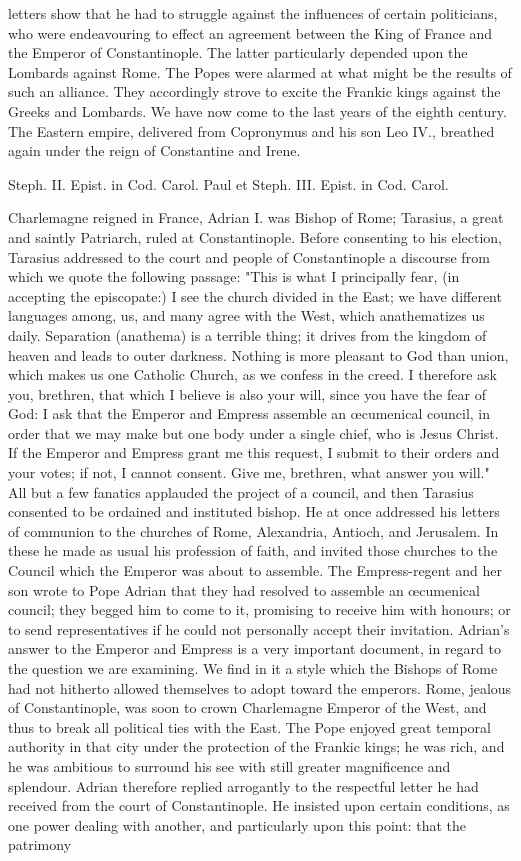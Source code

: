 letters show that he had to struggle against the influences of certain politicians, who were endeavouring to effect an agreement between the King of France and the Emperor of Constantinople. The latter particularly depended upon the Lombards against Rome. The Popes were alarmed at what might be the results of such an alliance. They accordingly strove to excite the Frankic kings against the Greeks and Lombards. We have now come to the last years of the eighth century. The Eastern empire, delivered from Copronymus and his son Leo IV., breathed again under the reign of Constantine and Irene.

Steph. II. Epist. in Cod. Carol. Paul et Steph. III. Epist. in Cod. Carol.

Charlemagne reigned in France, Adrian I. was Bishop of Rome; Tarasius, a great and saintly Patriarch, ruled at Constantinople. Before consenting to his election, Tarasius addressed to the court and people of Constantinople a discourse from which we quote the following passage: "This is what I principally fear, (in accepting the episcopate:) I see the church divided in the East; we have different languages among, us, and many agree with the West, which anathematizes us daily. Separation (anathema) is a terrible thing; it drives from the kingdom of heaven and leads to outer darkness. Nothing is more pleasant to God than union, which makes us one Catholic Church, as we confess in the creed. I therefore ask you, brethren, that which I believe is also your will, since you have the fear of God: I ask that the Emperor and Empress assemble an œcumenical council, in order that we may make but one body under a single chief, who is Jesus Christ. If the Emperor and Empress grant me this request, I submit to their orders and your votes; if not, I cannot consent. Give me, brethren, what answer you will." All but a few fanatics applauded the project of a council, and then Tarasius consented to be ordained and instituted bishop. He at once addressed his letters of communion to the churches of Rome, Alexandria, Antioch, and Jerusalem. In these he made as usual his profession of faith, and invited those churches to the Council which the Emperor was about to assemble. The Empress-regent and her son wrote to Pope Adrian that they had resolved to assemble an œcumenical council; they begged him to come to it, promising to receive him with honours; or to send representatives if he could not personally accept their invitation. Adrian's answer to the Emperor and Empress is a very important document, in regard to the question we are examining. We find in it a style which the Bishops of Rome had not hitherto allowed themselves to adopt toward the emperors. Rome, jealous of Constantinople, was soon to crown Charlemagne Emperor of the West, and thus to break all political ties with the East. The Pope enjoyed great temporal authority in that city under the protection of the Frankic kings; he was rich, and he was ambitious to surround his see with still greater magnificence and splendour. Adrian therefore replied arrogantly to the respectful letter he had received from the court of Constantinople. He insisted upon certain conditions, as one power dealing with another, and particularly upon this point: that the patrimony 